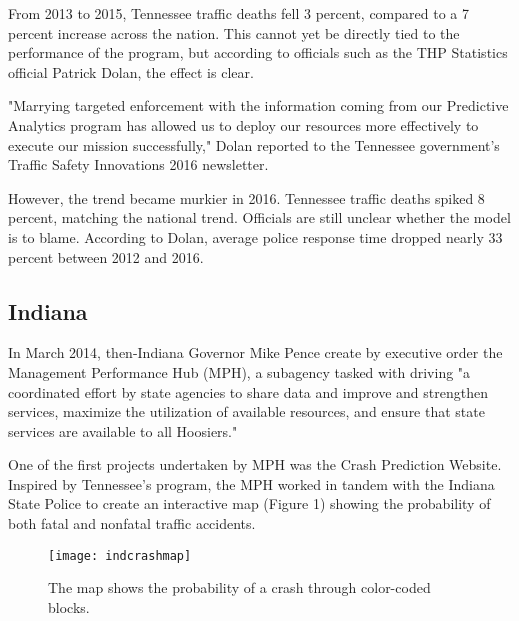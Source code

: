 \documentclass[sigconf]{acmart}
\begin{document}
From 2013 to 2015, Tennessee traffic deaths fell 3 percent, compared to a 7 percent increase across the nation. This cannot yet be directly tied to the performance of the program, but according to officials such as the THP Statistics official Patrick Dolan, the effect is clear.

"Marrying targeted enforcement with the information coming from our Predictive Analytics program has allowed us to deploy our resources more effectively to execute our mission successfully," Dolan reported to the Tennessee government's Traffic Safety Innovations 2016 newsletter. \cite{tennessee}

However, the trend became murkier in 2016. Tennessee traffic deaths spiked 8 percent, matching the national trend. Officials are still unclear whether the model is to blame. According to Dolan, average police response time dropped nearly 33 percent between 2012 and 2016. \cite{pew}

\subsection{Indiana}
In March 2014, then-Indiana Governor Mike Pence create by executive order the Management Performance Hub (MPH), a subagency tasked with driving "a coordinated effort by state agencies to share data and improve and strengthen services, maximize the utilization of available resources, and ensure that state services are available to all Hoosiers."\cite{pence}

One of the first projects undertaken by MPH was the Crash Prediction Website. Inspired by Tennessee's program\cite{govtech}, the MPH worked in tandem with the Indiana State Police to create an interactive map (Figure 1) showing the probability of both fatal and nonfatal traffic accidents. 

\begin{figure}
\texttt{[image: indcrashmap]}
\caption{The map shows the probability of a crash through color-coded blocks.\cite{indcrashmap}}
\end{figure}
\end{document}
